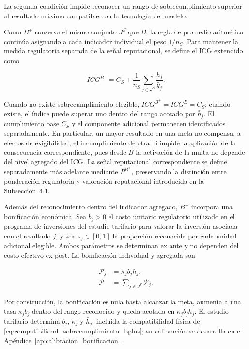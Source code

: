 La segunda condición impide reconocer un rango de sobrecumplimiento superior al resultado máximo compatible con la tecnología del modelo.

Como \(B^{+}\) conserva el mismo conjunto \(J^{S}\) que \(B\), la regla de promedio aritmético continúa asignando a cada indicador individual el peso \(1/n_S\). Para mantener la medida regulatoria separada de la señal reputacional, se define el ICG extendido como

\begin{equation}
\label{eq:cumplimiento_bplus}
ICG^{B^{+}}
=
C_S
+
\frac{1}{n_S}
\sum_{j\in J^{S}}
\frac{h_j}{\bar q_j}.
\end{equation}

Cuando no existe sobrecumplimiento elegible, \(ICG^{B^{+}}=ICG^B=C_S\); cuando existe, el índice puede superar uno dentro del rango acotado por \(\bar h_j\). El cumplimiento base \(C_S\) y el componente adicional permanecen identificados separadamente. En particular, un mayor resultado en una meta no compensa, a efectos de exigibilidad, el incumplimiento de otra ni impide la aplicación de la consecuencia correspondiente, pues desde \(B\) la activación de la multa no depende del nivel agregado del ICG. La señal reputacional correspondiente se define separadamente más adelante mediante \(P^{B^{+}}\), preservando la distinción entre ponderación regulatoria y valoración reputacional introducida en la Subsección~4.1.

Además del reconocimiento dentro del indicador agregado, \(B^{+}\) incorpora una bonificación económica. Sea \(b_j>0\) el costo unitario regulatorio utilizado en el programa de inversiones del estudio tarifario para valorar la inversión asociada con el resultado \(j\), y sea \(\kappa_j\in[0,1]\) la proporción reconocida por cada unidad adicional elegible. Ambos parámetros se determinan ex ante y no dependen del costo efectivo ex post. La bonificación individual y agregada son

\begin{subequations}
\label{eq:bonificacion_bplus}
\begin{align}
\mathcal P_j
&=
\kappa_j b_j h_j,
\label{eq:premio_individual}
\\
\mathcal P
&=
\sum_{j\in J^{S}}\mathcal P_j.
\label{eq:premio_agregado}
\end{align}
\end{subequations}

Por construcción, la bonificación es nula hasta alcanzar la meta, aumenta a una tasa \(\kappa_jb_j\) dentro del rango reconocido y queda acotada en \(\kappa_jb_j\bar h_j\). El estudio tarifario determina \(b_j\), \(\kappa_j\) y \(\bar h_j\), incluida la compatibilidad física de \eqref{eq:compatibilidad_sobrecumplimiento_bplus}; su calibración se desarrolla en el Apéndice~\ref{ap:calibracion_bonificacion}.

